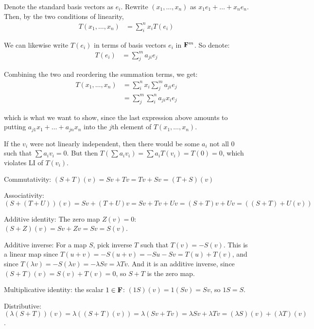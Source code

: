 \documentclass{article}
\begin{document}

Denote the standard basis vectors as $e_i$. Rewrite $(x_1, \ldots, x_n)$ as
$x_1e_1 + \ldots + x_ne_n$. Then, by the two conditions of linearity,
\begin{align*}
  T(x_1, \ldots, x_n) & = \sum_i^n x_iT(e_i)
\end{align*}

We can likewise write $T(e_i)$ in terms of basis vectors $e_i$ in $\mathbf{F}^m$. So
denote:
\begin{align*}
  T(e_i) & = \sum_j^m a_{ji}e_j
\end{align*}

Combining the two and reordering the summation terms, we get:
\begin{align*}
  T(x_1, \ldots, x_n) & = \sum_i^n x_i \sum_j^m a_{ji}e_j \\
                      & = \sum_j^m \sum_i^n a_{ji}x_ie_j
\end{align*}

which is what we want to show, since the last expression above amounts to
putting $a_{j1}x_1 + \ldots + a_{jn}x_n$ into the $j$th element of $T(x_1,
\ldots, x_n)$.


If the $v_i$ were not linearly independent, then there would be some $a_i$ not
all 0 such that $\sum a_iv_i = 0$. But then $T(\sum a_iv_i) = \sum a_iT(v_i) =
T(0) = 0$, which violates LI of $T(v_i)$.


Commutativity: $(S+T)(v) = Sv + Tv = Tv + Sv = (T+S)(v)$

Associativity: $(S+(T+U))(v) = Sv + (T+U)v = Sv + Tv + Uv = (S+T)v + Uv =
((S+T) + U(v))$

Additive identity: The zero map $Z(v) = 0$: $(S+Z)(v) = Sv + Zv = Sv = S(v)$.

Additive inverse: For a map $S$, pick inverse $T$ such that $T(v) = -S(v)$. This
is a linear map since $T(u+v) = -S(u+v) = -Su - Sv = T(u) + T(v)$, and since
$T(\lambda v) = -S(\lambda v) = -\lambda Sv = \lambda Tv$. And it is an additive
inverse, since $(S+T)(v) = S(v) + T(v) = 0$, so $S+T$ is the zero map.

Multiplicative identity: the scalar $1 \in \mathbf{F}$: $(1S)(v) = 1(Sv) = Sv$, so
$1S = S$.

Distributive: $(\lambda (S+T))(v) = \lambda ((S+T)(v)) = \lambda (Sv + Tv) =
\lambda Sv + \lambda Tv = (\lambda S)(v) + (\lambda T)(v)$.

\end{document}
